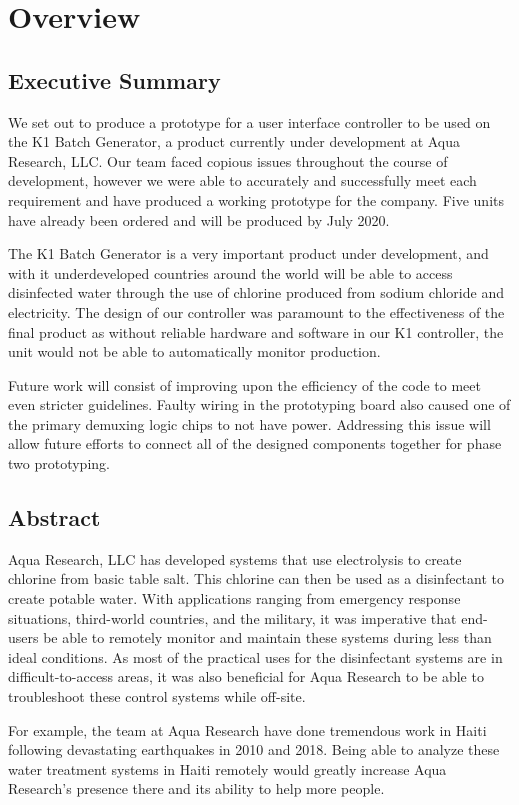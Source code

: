 \documentclass[12pt]{article}
\begin{document}
\section{Overview}\setlength{\parskip}{1em}
\subsection{Executive Summary}
We set out to produce a prototype for a user interface controller to be used on the K1 Batch Generator, a product currently under development at Aqua Research, LLC. Our team faced copious issues throughout the course of development, however we were able to accurately and successfully meet each requirement and have produced a working prototype for the company. Five units have already been ordered and will be produced by July 2020.

\noindent The K1 Batch Generator is a very important product under development, and with it underdeveloped countries around the world will be able to access disinfected water through the use of chlorine produced from sodium chloride and electricity. The design of our controller was paramount to the effectiveness of the final product as without reliable hardware and software in our K1 controller, the unit would not be able to automatically monitor production.
 
\noindent Future work will consist of improving upon the efficiency of the code to meet even stricter guidelines. Faulty wiring in the prototyping board also caused one of the primary demuxing logic chips to not have power. Addressing this issue will allow future efforts to connect all of the designed components together for phase two prototyping.

\subsection{Abstract}
Aqua Research, LLC has developed systems that use electrolysis to create chlorine from basic table salt. This chlorine can then be used as a disinfectant to create potable water. With applications ranging from emergency response situations, third-world countries, and the military, it was imperative that end-users be able to remotely monitor and maintain these systems during less than ideal conditions. As most of the practical uses for the disinfectant systems are in difficult-to-access areas, it was also beneficial for Aqua Research to be able to troubleshoot these control systems while off-site.

\noindent For example, the team at Aqua Research have done tremendous work in Haiti following devastating earthquakes in 2010 and 2018. Being able to analyze these water treatment systems in Haiti remotely would greatly increase Aqua Research’s presence there and its ability to help more people.
\end{document}
